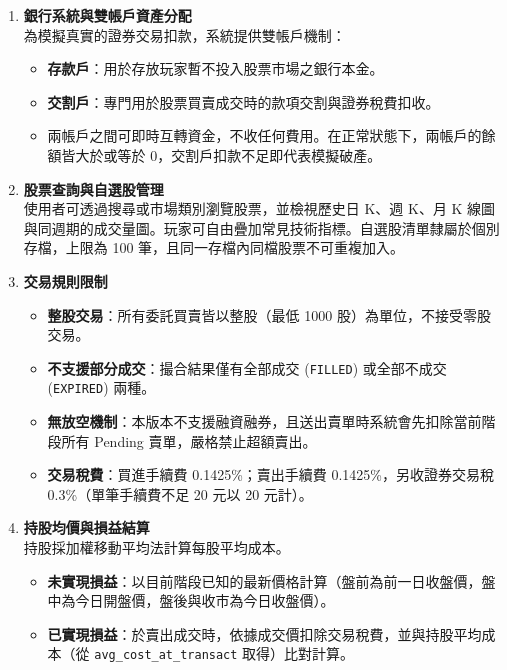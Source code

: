 \documentclass[UTF8, a4paper, 12pt, fontset=none]{ctexart}
\begin{document}
\begin{enumerate}
        \item \textbf{銀行系統與雙帳戶資產分配}\\
        為模擬真實的證券交易扣款，系統提供雙帳戶機制：
        \begin{itemize}
            \item \textbf{存款戶}：用於存放玩家暫不投入股票市場之銀行本金。
            \item \textbf{交割戶}：專門用於股票買賣成交時的款項交割與證券稅費扣收。
            \item 兩帳戶之間可即時互轉資金，不收任何費用。在正常狀態下，兩帳戶的餘額皆大於或等於 0，交割戶扣款不足即代表模擬破產。
        \end{itemize}

        \item \textbf{股票查詢與自選股管理}\\
        使用者可透過搜尋或市場類別瀏覽股票，並檢視歷史日 K、週 K、月 K 線圖與同週期的成交量圖。玩家可自由疊加常見技術指標。自選股清單隸屬於個別存檔，上限為 100 筆，且同一存檔內同檔股票不可重複加入。

        \item \textbf{交易規則限制}
        \begin{itemize}
            \item \textbf{整股交易}：所有委託買賣皆以整股（最低 1000 股）為單位，不接受零股交易。
            \item \textbf{不支援部分成交}：撮合結果僅有全部成交 (\texttt{FILLED}) 或全部不成交 (\texttt{EXPIRED}) 兩種。
            \item \textbf{無放空機制}：本版本不支援融資融券，且送出賣單時系統會先扣除當前階段所有 Pending 賣單，嚴格禁止超額賣出。
            \item \textbf{交易稅費}：買進手續費 0.1425\%；賣出手續費 0.1425\%，另收證券交易稅 0.3\%（單筆手續費不足 20 元以 20 元計）。
        \end{itemize}

        \item \textbf{持股均價與損益結算}\\
        持股採加權移動平均法計算每股平均成本。
        \begin{itemize}
            \item \textbf{未實現損益}：以目前階段已知的最新價格計算（盤前為前一日收盤價，盤中為今日開盤價，盤後與收市為今日收盤價）。
            \item \textbf{已實現損益}：於賣出成交時，依據成交價扣除交易稅費，並與持股平均成本（從 \texttt{avg\_cost\_at\_transact} 取得）比對計算。
        \end{itemize}
    \end{enumerate}
\end{document}

